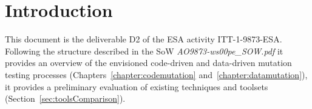 
\chapter*{Introduction}
\label{sec:introduction}

This document is the deliverable D2 of the ESA activity ITT-1-9873-ESA. Following the structure described in the SoW \emph{AO9873-ws00pe\_SOW.pdf} it provides an overview of the envisioned code-driven and data-driven mutation testing processes (Chapters~\ref{chapter:codemutation} and~\ref{chapter:datamutation}), it provides a preliminary evaluation of existing techniques and toolsets (Section~\ref{sec:toolsComparison}).
 
